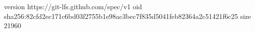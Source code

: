 version https://git-lfs.github.com/spec/v1
oid sha256:82cfd2ec171c6bd03f2755b1e98ac3bec7f835d5041feb82364a2c51421f6c25
size 21960
